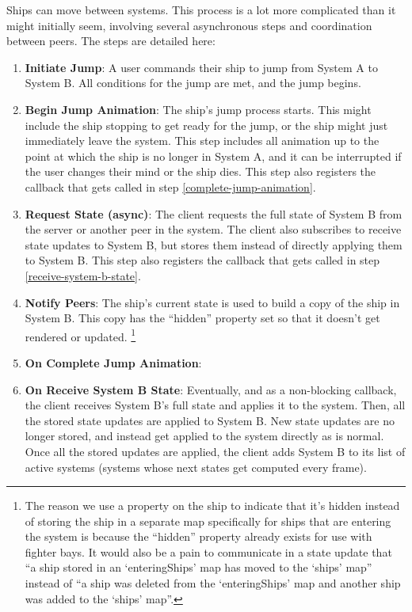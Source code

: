 \documentclass{article}
\begin{document}
Ships can move between systems. This process is a lot more complicated than it might initially seem, involving several asynchronous steps and coordination between peers. The steps are detailed here:
\begin{enumerate}
\item \textbf{Initiate Jump}: 
A user commands their ship to jump from System A to System B. All conditions for the jump are met, and the jump begins.

\item \textbf{Begin Jump Animation}:
  The ship's jump process starts. This might include the ship stopping to get ready for the jump, or the ship might just immediately leave the system. This step includes all animation up to the point at which the ship is no longer in System A, and it can be interrupted if the user changes their mind or the ship dies. This step also registers the callback that gets called in step \ref{complete-jump-animation}.

\item \textbf{Request State (async)}:
  The client requests the full state of System B from the server or another peer in the system. The client also subscribes to receive state updates to System B, but stores them instead of directly applying them to System B. This step also registers the callback that gets called in step \ref{receive-system-b-state}.

\item \textbf{Notify Peers}:
  The ship's current state is used to build a copy of the ship in System B. This copy has the ``hidden'' property set so that it doesn't get rendered or updated. \footnote{The reason we use a property on the ship to indicate that it's hidden instead of storing the ship in a separate map specifically for ships that are entering the system is because the ``hidden'' property already exists for use with fighter bays. It would also be a pain to communicate in a state update that ``a ship stored in an `enteringShips' map has moved to the `ships' map'' instead of ``a ship was deleted from the `enteringShips' map and another ship was added to the `ships' map''.}

\item \textbf{On Complete Jump Animation}: \label{complete-jump-animation}

  
\item \textbf{On Receive System B State}: \label{receive-system-b-state}
    Eventually, and as a non-blocking callback, the client receives System B's full state and applies it to the system. Then, all the stored state updates are applied to System B. New state updates are no longer stored, and instead get applied to the system directly as is normal. Once all the stored updates are applied, the client adds System B to its list of active systems (systems whose next states get computed every frame).
  
\end{enumerate}
\end{document}
